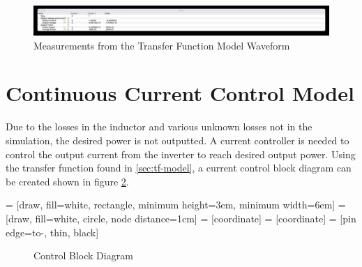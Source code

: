 \documentclass[12pt]{article}
\begin{document}
\begin{figure}[ht]
    \centering{}
    \includegraphics[width=\textwidth, height=0.4\textheight, keepaspectratio]{img/Transfer Function Cursor.jpg}
    \caption{Measurements from the Transfer Function Model Waveform}
    \label{fig:tf-cursor}
\end{figure}

\section{Continuous Current Control Model}
\label{sec:cont-cc-model}

Due to the losses in the inductor and various unknown losses not in the simulation, the desired power is not outputted.
A current controller is needed to control the output current from the inverter to reach desired output power.
Using the transfer function found in \ref{sec:tf-model}, a current control block diagram can be created shown in figure \ref{fig:control-block-diagram}.

 = [draw, fill=white, rectangle,
minimum height=3em, minimum width=6em]
 = [draw, fill=white, circle, node distance=1cm]
 = [coordinate]
 = [coordinate]
 = [pin edge={to-, thin, black}]

\begin{figure}
    \centering{}
    \caption{Control Block Diagram}
    \label{fig:control-block-diagram}
\end{figure}
\end{document}
